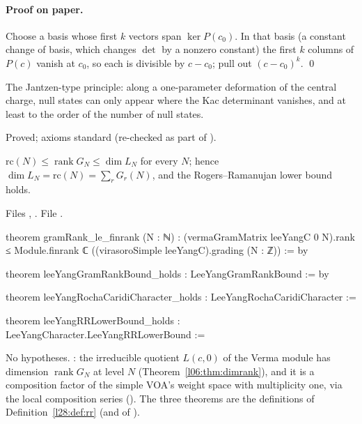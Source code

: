 \paragraph{Proof on paper.} Choose a basis whose first $k$ vectors span $\ker P(c_0)$. In that basis (a constant change of basis, which changes $\det$ by a nonzero
constant) the first $k$ columns of $P(c)$ vanish at $c_0$, so each is divisible by $c-c_0$; pull out $(c-c_0)^k$. \qed

\begin{physics}
The Jantzen-type principle: along a one-parameter deformation of the central charge, null states can only appear where the Kac determinant vanishes, and at
least to the order of the number of null states.
\end{physics}

\begin{status}
Proved; axioms standard (re-checked as part of ).
\end{status}

\begin{theorem}\label{l28:thm:lychar}
$\mathrm{rc}(N)\le\operatorname{rank}G_N\le\dim L_N$ for every $N$; hence $\dim L_N=\mathrm{rc}(N)=\sum_rG_r(N)$, and the Rogers--Ramanujan lower bound holds.
\end{theorem}

\noindent Files , .
\noindent File .
\begin{leancode}
theorem gramRank_le_finrank (N : ℕ) :
    (vermaGramMatrix leeYangC 0 N).rank ≤
      Module.finrank ℂ ((virasoroSimple leeYangC).grading (N : ℤ)) := by

theorem leeYangGramRankBound_holds : LeeYangGramRankBound := by

theorem leeYangRochaCaridiCharacter_holds : LeeYangRochaCaridiCharacter :=

theorem leeYangRRLowerBound_holds : LeeYangCharacter.LeeYangRRLowerBound :=
\end{leancode}

\begin{dictionary}
No hypotheses. : the irreducible quotient $L(c,0)$ of the Verma module has dimension $\operatorname{rank}G_N$ at level $N$
(Theorem~\ref{l06:thm:dimrank}), and it is a composition factor of the simple VOA's weight space with multiplicity one, via the local composition series
(). The three  theorems are the definitions of Definition~\ref{l28:def:rr} (and of ).
\end{dictionary}

